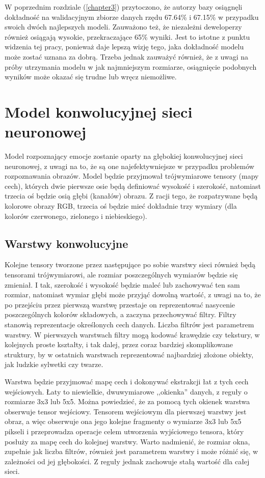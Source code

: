W poprzednim rozdziale (\ref{chapter3}) przytoczono, że autorzy bazy osiągnęli dokładność na walidacyjnym zbiorze danych rzędu 67.64\% i 67.15\% w przypadku swoich dwóch najlepszych modeli. Zauważono też, że niezależni deweloperzy również osiągają wysokie, przekraczające 65\% wyniki. Jest to istotne z punktu widzenia tej pracy, ponieważ daje lepszą wizję tego, jaka dokładność modelu może zostać uznana za dobrą. Trzeba jednak zauważyć również, że z uwagi na próby utrzymania modelu w jak najmniejszym rozmiarze, osiągnięcie podobnych wyników może okazać się trudne lub wręcz niemożliwe.


\section{Model konwolucyjnej sieci neuronowej}
Model rozpoznający emocje zostanie oparty na głębokiej konwolucyjnej sieci neuronowej, z uwagi na to, że są one najefektywniejsze w przypadku problemów rozpoznawania obrazów. Model będzie przyjmował trójwymiarowe tensory (mapy cech), których dwie pierwsze osie będą definiować wysokość i szerokość, natomiast trzecia oś będzie osią głębi (kanałów) obrazu. Z racji tego, że rozpatrywane będą kolorowe obrazy RGB, trzecia oś będzie mieć dokładnie trzy wymiary (dla kolorów czerwonego, zielonego i niebieskiego).

\subsection{Warstwy konwolucyjne}
Kolejne tensory tworzone przez następujące po sobie warstwy sieci również będą tensorami trójwymiarowi, ale rozmiar poszczególnych wymiarów będzie się zmieniał. I tak, szerokość i wysokość będzie maleć lub zachowywać ten sam rozmiar, natomiast wymiar głębi może przyjąć dowolną wartość, z uwagi na to, że po przejściu przez pierwszą warstwę przestaje on reprezentować nasycenie poszczególnych kolorów składowych, a zaczyna przechowywać filtry. Filtry stanowią reprezentacje określonych cech danych. Liczba filtrów jest parametrem warstwy.
W pierwszych warstwach filtry mogą kodować krawędzie czy tekstury, w kolejnych proste kształty, i tak dalej, przez coraz bardziej skomplikowane struktury, by w ostatnich warstwach reprezentować najbardziej złożone obiekty, jak ludzkie sylwetki czy twarze.

Warstwa będzie przyjmować mapę cech i dokonywać ekstrakcji łat z tych cech wejściowych. Łaty to niewielkie, dwuwymiarowe ,,okienka'' danych, z reguły o rozmiarze 3x3 lub 5x5. Można powiedzieć, że za pomocą tych okienek warstwa obserwuje tensor wejściowy. Tensorem wejściowym dla pierwszej warstwy jest obraz, a więc obserwuje ona jego kolejne fragmenty o wymiarze 3x3 lub 5x5 pikseli i przeprowadza operacje celem utworzenia wyjściowego tensora, który posłuży za mapę cech do kolejnej warstwy. Warto nadmienić, że rozmiar okna, zupełnie jak liczba filtrów, również jest parametrem warstwy i może różnić się, w zależności od jej głębokości. Z reguły jednak zachowuje stałą wartość dla całej sieci.

